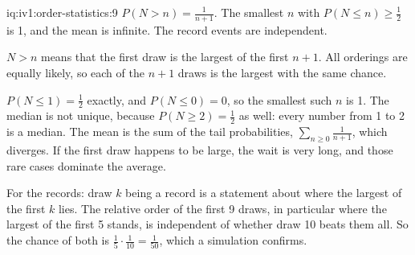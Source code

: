 \begin{solution}{iq:iv1:order-statistics:9}
$P(N > n) = \frac{1}{n + 1}$. The smallest $n$ with $P(N \le n) \ge \frac12$ is 1, and the mean is infinite. The record events are independent.

$N > n$ means that the first draw is the largest of the first $n + 1$. All orderings are equally likely, so each of the $n + 1$ draws is the largest with the same chance.

$P(N \le 1) = \tfrac12$ exactly, and $P(N \le 0) = 0$, so the smallest such $n$ is 1. The median is not unique, because $P(N \ge 2) = \tfrac12$ as well: every number from 1 to 2 is a median. The mean is the sum of the tail probabilities, $\sum_{n \ge 0} \frac{1}{n + 1}$, which diverges. If the first draw happens to be large, the wait is very long, and those rare cases dominate the average.

For the records: draw $k$ being a record is a statement about where the largest of the first $k$ lies. The relative order of the first 9 draws, in particular where the largest of the first 5 stands, is independent of whether draw 10 beats them all. So the chance of both is $\tfrac15 \cdot \tfrac{1}{10} = \tfrac{1}{50}$, which a simulation confirms.

\end{solution}

